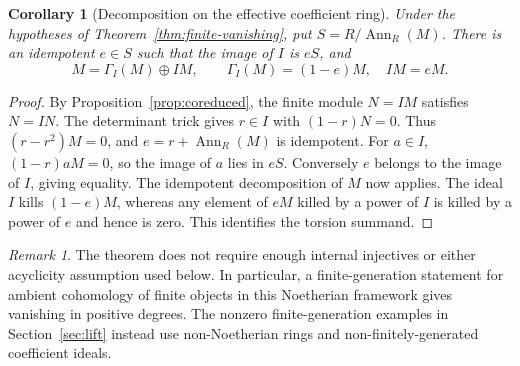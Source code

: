 \documentclass[11pt,reqno]{amsart}
\newtheorem{corollary}[theorem]{Corollary}
\theoremstyle{definition}
\theoremstyle{remark}
\newtheorem{remark}[theorem]{Remark}
\newcommand{\Ann}{\operatorname{Ann}}
\begin{document}
\begin{corollary}[Decomposition on the effective coefficient ring]\label{cor:decomposition}
Under the hypotheses of Theorem~\ref{thm:finite-vanishing}, put $S=R/\Ann_R(M)$. There is an idempotent $e\in S$ such that the image of $I$ is $eS$, and
\[
M=\Gamma_I(M)\oplus IM,\qquad \Gamma_I(M)=(1-e)M,\quad IM=eM.
\]
\end{corollary}
\begin{proof}
By Proposition~\ref{prop:coreduced}, the finite module $N=IM$ satisfies $N=IN$. The determinant trick gives $r\in I$ with $(1-r)N=0$. Thus $(r-r^2)M=0$, and $e=r+\Ann_R(M)$ is idempotent. For $a\in I$, $(1-r)aM=0$, so the image of $a$ lies in $eS$. Conversely $e$ belongs to the image of $I$, giving equality. The idempotent decomposition of $M$ now applies. The ideal $I$ kills $(1-e)M$, whereas any element of $eM$ killed by a power of $I$ is killed by a power of $e$ and hence is zero. This identifies the torsion summand.
\end{proof}

\begin{remark}\label{rem:finite-scope}
The theorem does not require enough internal injectives or either acyclicity assumption used below. In particular, a finite-generation statement for ambient cohomology of finite objects in this Noetherian framework gives vanishing in positive degrees. The nonzero finite-generation examples in Section~\ref{sec:lift} instead use non-Noetherian rings and non-finitely-generated coefficient ideals.
\end{remark}
\end{document}
